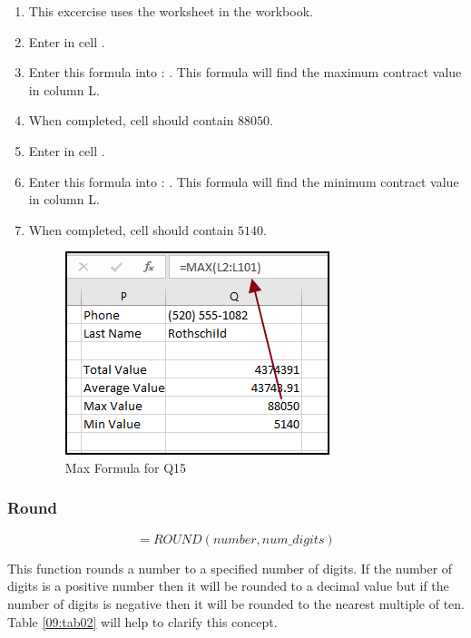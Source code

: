 \begin{enumerate}
	\item This excercise uses the  worksheet in the  workbook.
	\item Enter  in cell .
	\item Enter this formula into : . This formula will find the maximum contract value in column L.
	\item When completed, cell  should contain $ 88050 $.
	\item Enter  in cell .
	\item Enter this formula into : . This formula will find the minimum contract value in column L.
	\item When completed, cell  should contain $ 5140 $.

	\begin{figure}[H]
		\centering
		\includegraphics[width=\maxwidth{.95\linewidth}]{gfx/ch09_fig40}
		\caption{Max Formula for Q15}
		\label{09:fig40}
	\end{figure}

\end{enumerate}

\subsubsection{Round}

\[ =ROUND(number, num\_digits) \]

This function rounds a number to a specified number of digits. If the number of digits is a positive number then it will be rounded to a decimal value but if the number of digits is negative then it will be rounded to the nearest multiple of ten. Table \ref{09:tab02} will help to clarify this concept.

